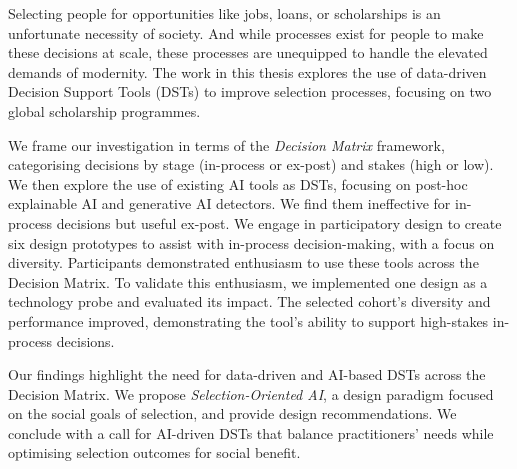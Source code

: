 Selecting people for opportunities like jobs, loans, or scholarships is an unfortunate necessity of society. And while processes exist for people to make these decisions at scale, these processes are unequipped to handle the elevated demands of modernity. The work in this thesis explores the use of data-driven Decision Support Tools (DSTs) to improve selection processes, focusing on two global scholarship programmes.

We frame our investigation in terms of the \emph{Decision Matrix} framework, categorising decisions by stage (in-process or ex-post) and stakes (high or low). We then explore the use of existing AI tools as DSTs, focusing on post-hoc explainable AI and generative AI detectors. We find them ineffective for in-process decisions but useful ex-post. We engage in participatory design to create six design prototypes to assist with in-process decision-making, with a focus on diversity. Participants demonstrated enthusiasm to use these tools across the Decision Matrix. To validate this enthusiasm, we implemented one design as a technology probe and evaluated its impact. The selected cohort's diversity and performance improved, demonstrating the tool's ability to support high-stakes in-process decisions. 

Our findings highlight the need for data-driven and AI-based DSTs across the Decision Matrix. We propose \emph{Selection-Oriented AI}, a design paradigm focused on the social goals of selection, and provide design recommendations. We conclude with a call for AI-driven DSTs that balance practitioners' needs while optimising selection outcomes for social benefit.